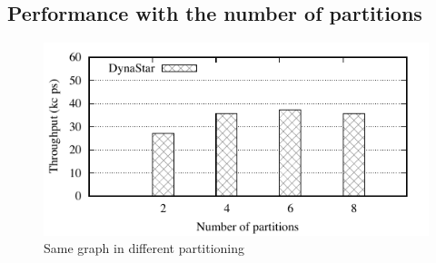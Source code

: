 

\subsection{Performance with the number of partitions}
\label{sec:evaluation:results}

\begin{figure}[ht]
	\includegraphics{figures/experiments/throughput-avg-vary-partition}
	\caption{Same graph in different partitioning}
	\label{fig:4p1p_varying_partition_size}
\end{figure}




